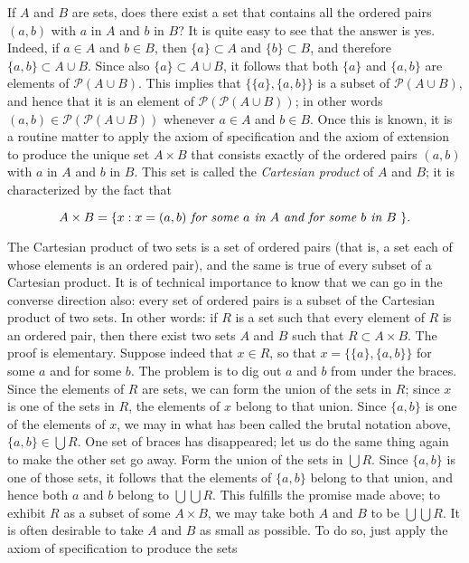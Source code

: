 If $A$ and $B$ are sets, does there exist a set that contains all the ordered pairs $(a,b)$ with $a$ in $A$ and $b$ in $B$? It is quite easy to see that the answer is yes. Indeed, if $a \in A$ and $b \in B$, then $ \{ a \} \subset A$ and $ \{ b \}  \subset B$, and therefore $ \{ a, b \} \subset A \cup B$. Since also $ \{ a \} \subset A \cup B$, it follows that both $ \{ a \}$ and $ \{ a, b \} $ are elements of $ \mathcal{P} (A \cup B)$. This implies that $ \{ \{ a \}, \{ a,b \} \} $ is a subset of $ \mathcal{P} (A \cup B) $, and hence that it is an element of $ \mathcal{P} ( \mathcal{P} (A \cup B))$; in other words $(a, b) \in \mathcal{P} ( \mathcal{P} (A \cup B))$ whenever $ a \in  A$ and $ b \in B$. Once this is known, it is a routine matter to apply the axiom of specification and the axiom of extension to produce the unique set $A \times B$ that consists exactly of the ordered pairs $(a, b)$ with $a$ in $A$ and $b$ in $B$. This set is called the \textit{Cartesian product} of $A$ and $B$; it is characterized by the fact that 

\begin{equation*}
A \times B = \{ x: x = (a,b) \text{ \textit{for some $a$ in $A$ and for some $b$ in $B$} } \}.
\end{equation*}

The Cartesian product of two sets is a set of ordered pairs (that is, a set each of whose elements is an ordered pair), and the same is true of every subset of a Cartesian product. It is of technical importance to know that we can go in the converse direction also: every set of ordered pairs is a subset of the Cartesian product of two sets. In other words: if $R$ is a set such that every element of $R$ is an ordered pair, then there exist two sets $A$ and $B$ such that $R \subset A \times B $. The proof is elementary. Suppose indeed that $ x \in R$, so that $ x = \{ \{ a \}, \{ a, b \} \}$ for some $a$ and for some $b$. The problem is to dig out $a$ and $b$ from under the braces. Since the elements of $R$ are sets, we can form the union of the sets in $R$; since $x$ is one of the sets in $R$, the elements of $x$ belong to that union. Since $\{ a,b \}$ is one of the elements of $x$, we may in what has been called the brutal notation above, $ \{a,b \} \in \bigcup R$. One set of braces has disappeared; let us do the same thing again to make the other set go away. Form the union of the sets in $ \bigcup R$. Since $ \{ a, b \}$ is one of those sets, it follows that the elements of $ \{ a,b \}$ belong to that union, and hence both $a$ and $b$ belong to $ \bigcup \bigcup R$. This fulfills the promise made above; to exhibit $R$ as a subset of some $A \times B$, we may take both $A$ and $B$ to be $ \bigcup \bigcup R$. It is often desirable to take $A$ and $B$ as small as possible. To do so, just apply the axiom of specification to produce the sets

